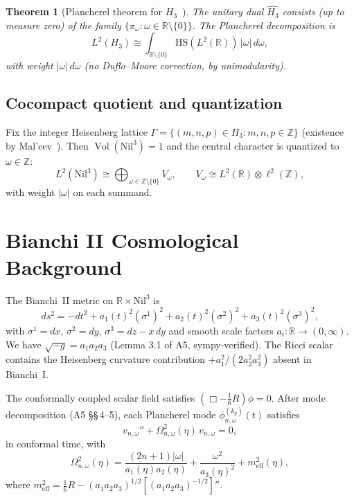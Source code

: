 \documentclass[11pt, a4paper]{article}
\newtheorem{theorem}{Theorem}
\newcommand{\RR}{\mathbb{R}}
\newcommand{\ZZ}{\mathbb{Z}}
\newcommand{\Hgroup}{H_3}
\newcommand{\Nil}{\mathrm{Nil}^3}
\newcommand{\piom}{\pi_\omega}
\newcommand{\HS}{\mathrm{HS}}
\newcommand{\Vol}{\operatorname{Vol}}
\newcommand{\om}{\omega}
\newcommand{\dGhat}{\widehat{\Hgroup}}
\begin{document}
\begin{theorem}[Plancherel theorem for $\Hgroup$~\cite{Folland1989,Pukan67}]
\label{thm:plancherel}
The unitary dual $\dGhat$ consists (up to measure zero) of the family
$\{\piom : \om \in \RR\setminus\{0\}\}$. The Plancherel decomposition is
\begin{equation}\label{eq:plancherel}
  L^2(\Hgroup) \cong \int_{\RR\setminus\{0\}} \HS(L^2(\RR))\,|\om|\,d\om,
\end{equation}
with weight $|\om|\,d\om$ (no Duflo--Moore correction, by unimodularity).
\end{theorem}

\subsection{Cocompact quotient and quantization}

Fix the integer Heisenberg lattice
$\Gamma = \{(m,n,p)\in \Hgroup : m,n,p\in\ZZ\}$ (existence by Mal'cev~\cite{Mal51}).
Then $\Vol(\Nil) = 1$ and the central character is quantized to $\om \in \ZZ$:
\begin{equation}\label{eq:plancherel_nil}
  L^2(\Nil) \cong \bigoplus_{\om \in \ZZ\setminus\{0\}} V_\om,
  \qquad V_\om \cong L^2(\RR) \otimes \ell^2(\ZZ),
\end{equation}
with weight $|\om|$ on each summand.

\section{Bianchi II Cosmological Background}

The Bianchi~II metric on $\RR \times \Nil$ is
\begin{equation}\label{eq:BII_metric}
  ds^2 = -dt^2 + a_1(t)^2(\sigma^1)^2 + a_2(t)^2(\sigma^2)^2 + a_3(t)^2(\sigma^3)^2,
\end{equation}
with $\sigma^1=dx,\,\sigma^2=dy,\,\sigma^3=dz-x\,dy$ and smooth scale factors
$a_i:\RR\to(0,\infty)$. We have $\sqrt{-g} = a_1 a_2 a_3$ (Lemma 3.1 of A5,
sympy-verified). The Ricci scalar contains the Heisenberg curvature contribution
$+a_1^2/(2a_2^2 a_3^2)$ absent in Bianchi~I.

The conformally coupled scalar field satisfies
$(\Box - \tfrac{1}{6}R)\phi = 0$. After mode decomposition (A5 \S\S\,4--5),
each Plancherel mode $\phi_{n,\om}^{(k_y)}(t)$ satisfies
\begin{equation}\label{eq:mode}
  v_{n,\om}'' + \Omega_{n,\om}^2(\eta)\,v_{n,\om} = 0,
\end{equation}
in conformal time, with
\begin{equation}\label{eq:Omega}
  \Omega_{n,\om}^2(\eta) = \frac{(2n+1)|\om|}{a_1(\eta)a_2(\eta)}
    + \frac{\om^2}{a_3(\eta)^2} + m_{\mathrm{eff}}^2(\eta),
\end{equation}
where $m_{\mathrm{eff}}^2 = \tfrac{1}{6}R - (a_1 a_2 a_3)^{1/2}[(a_1 a_2 a_3)^{-1/2}]''$.
\end{document}
